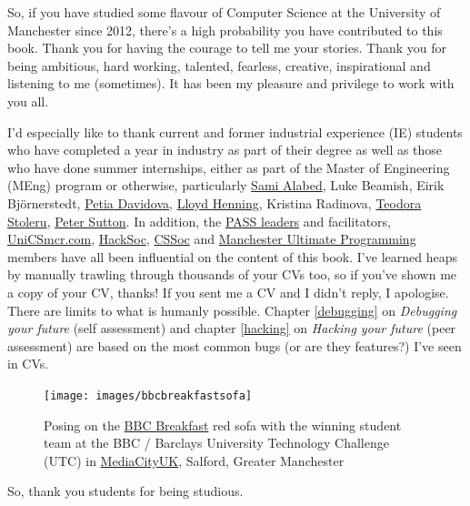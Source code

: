 \documentclass[
]{book}
\begin{document}
So, if you have studied some flavour of Computer Science at the University of Manchester since 2012, there's a high probability you have contributed to this book. Thank you for having the courage to tell me your stories. Thank you for being ambitious, hard working, talented, fearless, creative, inspirational and listening to me (sometimes). It has been my pleasure and privilege to work with you all.

I'd especially like to thank current and former industrial experience (IE) students who have completed a year in industry as part of their degree as well as those who have done summer internships, either as part of the Master of Engineering (MEng) program or otherwise, particularly \href{https://github.com/samialabed}{Sami Alabed}, Luke Beamish, Eirik Björnerstedt, \href{https://www.youtube.com/channel/UCDmn8CxaXGxZSKq83vhzULw}{Petia Davidova}, \href{https://github.com/eldog}{Lloyd Henning}, Kristina Radinova, \href{https://github.com/teostoleru}{Teodora Stoleru}, \href{https://github.com/dj-foxxy}{Peter Sutton}. In addition, the \href{http://www.pass.manchester.ac.uk}{PASS leaders} and facilitators, \href{https://unicsmcr.com/}{UniCSmcr.com}, \href{https://github.com/unicsmcr/hacksoc.com}{HackSoc}, \href{https://github.com/cssoc}{CSSoc} and \href{https://github.com/Man-UP}{Manchester Ultimate Programming} members have all been influential on the content of this book. I've learned heaps by manually trawling through thousands of your CVs too, so if you've shown me a copy of your CV, thanks! If you sent me a CV and I didn't reply, I apologise. There are limits to what is humanly possible. Chapter \ref{debugging} on \emph{Debugging your future} (self assessment) and chapter \ref{hacking} on \emph{Hacking your future} (peer assessment) are based on the most common bugs (or are they features?) I've seen in CVs.

\begin{figure}

{\centering \texttt{[image: images/bbcbreakfastsofa]} 

}

\caption{Posing on the \href{https://en.wikipedia.org/wiki/BBC_Breakfast}{BBC Breakfast} red sofa with the winning student team at the BBC / Barclays University Technology Challenge (UTC) in \href{https://en.wikipedia.org/wiki/MediaCityUK}{MediaCityUK}, Salford, Greater Manchester}\label{fig:unnamed-chunk-3}
\end{figure}



So, thank you students for being studious. 🙏
\end{document}
